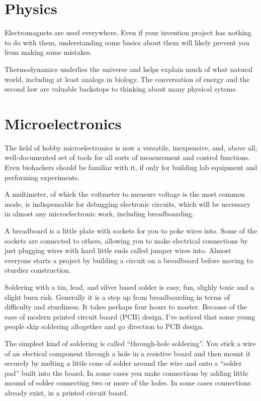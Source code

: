 \documentclass[
	fontsize=10pt, %
	twoside=false, %
	secnumdepth=1, %
]{kaobook}
\begin{document}
\section{Physics}

Electromagnets are used everywhere. Even if your invention project has nothing
to do with them, understanding some basics about them will likely prevent
you from making some mistakes.

Thermodynamics underlies the universe and helps explain much of what natural
world, including at least analogs in biology. The conversation of energy
and the second law are valuable backstops to thinking about many physical
sytems.

\section{Microelectronics}

The field of hobby microelectronics is now a versatile, inexpensive,
and, above all, well-documented set of tools for all sorts of measurement
and control functions.
Even biohackers should be familiar with it, if only for building
lab equipment and performing experiments.

A multimeter, of which the voltmeter to measure voltage is the most
common mode, is indispensable for debugging electronic circuits,
which will be necessary in almost any microelectronic work,
including breadboarding.

A breadboard is a little plate with sockets for you to poke wires
into. Some of the sockets are connected to others, allowing you to
make electrical connections by just plugging wires with hard little
ends called jumper wires into. Almost everyone starts a project
by building a circuit on a breadboard before moving to sturdier construction.

Soldering with a tin, lead, and silver based solder
is easy, fun, slighly toxic and a slight burn risk.
Generally it is a step up from breadboarding in terms of difficulty and
sturdiness. It takes perhaps four hours to master.
Because of the ease of modern printed circuit board (PCB) design,
I've noticed that some young people skip soldering altogether and
go direction to PCB design.

The simplest kind of soldering is called ``through-hole soldering''.
You stick a wire of an electical component through a hole in a
resistive board and then mount it securely by melting a little cone
of solder around the wire and onto a ``solder pad'' built into the
board. In some cases you make connections by adding little mound
of solder connecting two or more of the holes. In some cases
connections already exist, in a printed circuit board.
\end{document}

